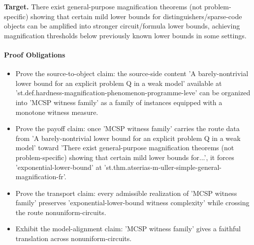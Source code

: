 \documentclass[11pt]{article}
\begin{document}
\textbf{Target.} There exist general-purpose magnification theorems (not problem-specific) showing that certain mild lower bounds for distinguishers/sparse-code objects can be amplified into stronger circuit/formula lower bounds, achieving magnification thresholds below previously known lower bounds in some settings.

\paragraph{Proof Obligations}
\begin{itemize}[leftmargin=*,itemsep=0.2em]
\item Prove the source-to-object claim: the source-side content 'A barely-nontrivial lower bound for an explicit problem Q in a weak model' available at 'st.def.hardness-magnification-phenomenon-programme-leve' can be organized into 'MCSP witness family' as a family of instances equipped with a monotone witness measure.
\item Prove the payoff claim: once 'MCSP witness family' carries the route data from 'A barely-nontrivial lower bound for an explicit problem Q in a weak model' toward 'There exist general-purpose magnification theorems (not problem-specific) showing that certain mild lower bounds for...', it forces 'exponential-lower-bound' at 'st.thm.atserias-m-uller-simple-general-magnification-fr'.
\item Prove the transport claim: every admissible realization of 'MCSP witness family' preserves 'exponential-lower-bound witness complexity' while crossing the route nonuniform-circuits.
\item Exhibit the model-alignment claim: 'MCSP witness family' gives a faithful translation across nonuniform-circuits.
\end{itemize}
\end{document}
